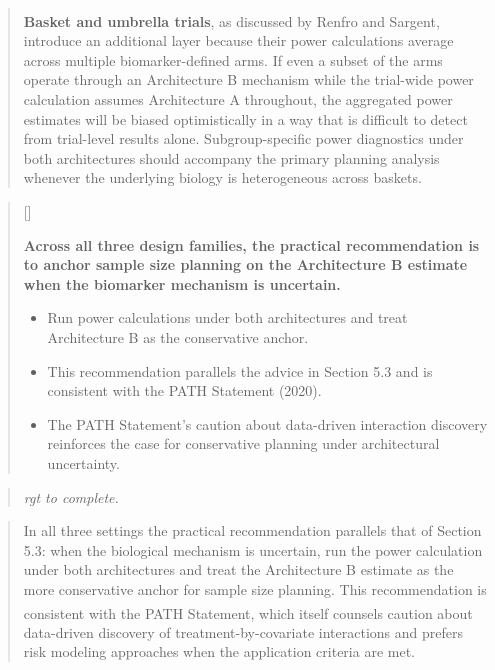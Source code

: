 \documentclass[
  11pt,
]{article}
\newcounter{pgraph}
\newenvironment{bullets}{%
  \stepcounter{pgraph}%
  \begin{quote}\small\sffamily\color[gray]{0.30}%
  {\normalfont\scriptsize\color[gray]{0.58}[\thepgraph]\enspace}}{%
  \end{quote}}
\newenvironment{rgt}{%
  \begin{quote}\small\itshape\color[RGB]{20,60,160}}{%
  \end{quote}}
\newenvironment{orig}{%
  \begin{quote}\normalsize\color[gray]{0.55}}{%
  \end{quote}}
\begin{document}
\begin{orig}
\textbf{Basket and umbrella trials}, as discussed by Renfro and
Sargent\textsuperscript{}, introduce an
additional layer because their power calculations average across
multiple biomarker-defined arms. If even a subset of the arms operate
through an Architecture B mechanism while the trial-wide power
calculation assumes Architecture A throughout, the aggregated power
estimates will be biased optimistically in a way that is difficult to
detect from trial-level results alone. Subgroup-specific power
diagnostics under both architectures should accompany the primary
planning analysis whenever the underlying biology is heterogeneous
across baskets.

\end{orig}

\begin{bullets}

\textbf{Across all three design families, the practical
recommendation is to anchor sample size planning on the
Architecture B estimate when the biomarker mechanism is
uncertain.}

\begin{itemize}\setlength{\itemsep}{2pt}\setlength{\parskip}{0pt}
\item Run power calculations under both architectures and treat
  Architecture B as the conservative anchor.
\item This recommendation parallels the advice in Section 5.3
  and is consistent with the PATH Statement (2020).
\item The PATH Statement's caution about data-driven
  interaction discovery reinforces the case for conservative
  planning under architectural uncertainty.
\end{itemize}

\end{bullets}

\begin{rgt}
rgt to complete.

\end{rgt}

\begin{orig}
In all three settings the practical recommendation parallels that of
Section 5.3: when the biological mechanism is uncertain, run the power
calculation under both architectures and treat the Architecture B
estimate as the more conservative anchor for sample size planning. This
recommendation is consistent with the PATH
Statement\textsuperscript{}, which itself
counsels caution about data-driven discovery of treatment-by-covariate
interactions and prefers risk modeling approaches when the application
criteria are met.

\end{orig}
\end{document}
